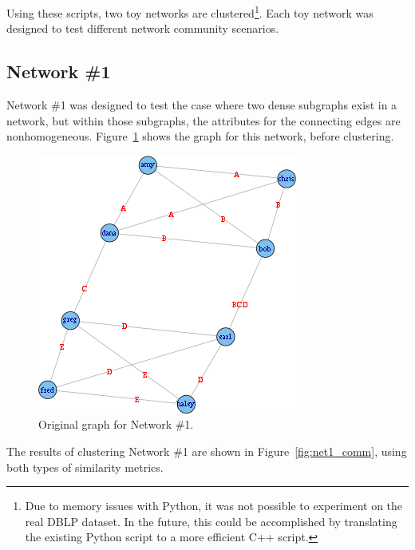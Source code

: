 \documentclass{report} %
\begin{document}
Using these scripts, two toy networks are clustered\footnote{Due to memory issues with Python, it was not possible to experiment on the real DBLP dataset. In the future, this could be accomplished by translating the existing Python script to a more efficient C++ script.}. Each toy network was designed to test different network community scenarios.

\subsection*{Network \#1}

Network \#1 was designed to test the case where two dense subgraphs exist in a network, but within those subgraphs, the attributes for the connecting edges are nonhomogeneous. Figure~\ref{fig:net1_orig} shows the graph for this network, before clustering.\\

\begin{figure}[htp!]
  \centering
  \includegraphics[width=0.5\linewidth]{toy2/orig.png}
  \caption{Original graph for Network \#1.}
  \label{fig:net1_orig}
\end{figure}

\newpage
The results of clustering Network \#1 are shown in Figure~\ref{fig:net1_comm}, using both types of similarity metrics.\\
\end{document}
